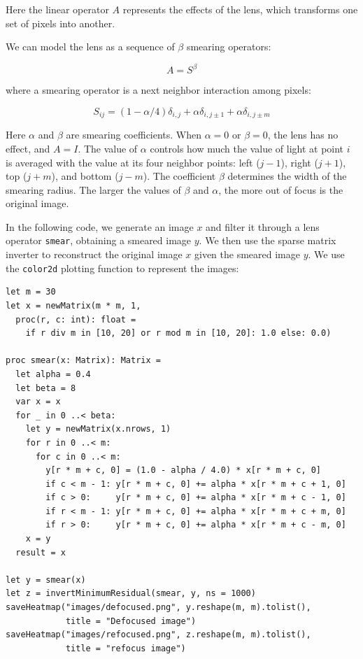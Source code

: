 \documentclass[justified, sixbynine]{tufte-book}
\def\ft{\small\tt}
\theoremstyle{plain}%
\newtheorem * {corollary}{Corollary}
\theoremstyle{definition}
\theoremstyle{remark}
\newtheorem * {remark}{Remark}
\newtheorem * {note}{Note}
\begin{document}
\begin{fullwidth}
Here the linear operator $A$ represents the effects of the lens, which transforms one set of pixels into another.

We can model the lens as a sequence of $\beta$ smearing operators:

\begin{equation}
A = S^{\beta}
\end{equation}

where a smearing operator is a next neighbor interaction among pixels:

\begin{equation}
S_{ij} = (1-\alpha/4) \delta_{i, j} + \alpha \delta_{i, j\pm 1} + \alpha \delta_{i, j\pm m}
\end{equation}

Here $\alpha$ and $\beta$ are smearing coefficients. When $\alpha=0$ or $\beta=0$, the lens has no effect, and $A = I$. The value of $\alpha$ controls how much the value of light at point $i$ is averaged with the value at its four neighbor points: left ($j-1$), right ($j+1$), top ($j+m$), and bottom ($j-m$). The coefficient $\beta$ determines the width of the smearing radius. The larger the values of $\beta$ and $\alpha$, the more out of focus is the original image.


In the following code, we generate an image $x$ and filter it through a lens operator {\ft smear}, obtaining a smeared image $y$. We then use the sparse matrix inverter to reconstruct the original image $x$ given the smeared image $y$. We use the {\ft color2d} plotting function to represent the images:

\begin{lstlisting}
let m = 30
let x = newMatrix(m * m, 1,
  proc(r, c: int): float =
    if r div m in [10, 20] or r mod m in [10, 20]: 1.0 else: 0.0)

proc smear(x: Matrix): Matrix =
  let alpha = 0.4
  let beta = 8
  var x = x
  for _ in 0 ..< beta:
    let y = newMatrix(x.nrows, 1)
    for r in 0 ..< m:
      for c in 0 ..< m:
        y[r * m + c, 0] = (1.0 - alpha / 4.0) * x[r * m + c, 0]
        if c < m - 1: y[r * m + c, 0] += alpha * x[r * m + c + 1, 0]
        if c > 0:     y[r * m + c, 0] += alpha * x[r * m + c - 1, 0]
        if r < m - 1: y[r * m + c, 0] += alpha * x[r * m + c + m, 0]
        if r > 0:     y[r * m + c, 0] += alpha * x[r * m + c - m, 0]
    x = y
  result = x

let y = smear(x)
let z = invertMinimumResidual(smear, y, ns = 1000)
saveHeatmap("images/defocused.png", y.reshape(m, m).tolist(),
            title = "Defocused image")
saveHeatmap("images/refocused.png", z.reshape(m, m).tolist(),
            title = "refocus image")
\end{lstlisting}


\end{fullwidth}
\end{document}
